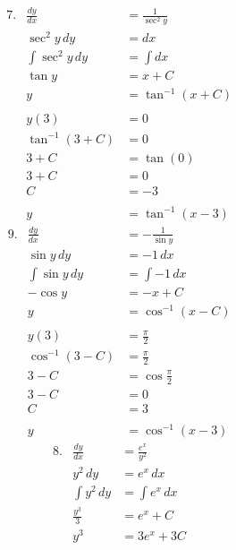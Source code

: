 \documentclass[12pt]{article}
\begin{document}
\begin{multicols*}{2}
    \vspace*{-100pt}
    \begin{align*}
        &7.& \frac{dy}{dx} &= \frac{1}{\sec^2\! y} \\
        &&\sec^2\! y\,dy &= dx \\
        &&\int \sec^2\!y\,dy &= \int dx \\
        &&\tan y &= x + C \\
        &&y &= \tan^{-1}(x + C) \\ \\
        &&y(3) &= 0 \\ 
        &&\tan^{-1}(3 + C) &= 0 \\
        &&3+C &= \tan(0) \\
        &&3 + C &= 0 \\
        &&C &= -3 \\ \\
        &&y &= \tan^{-1}(x - 3)
    \end{align*}
    \vspace{30pt}
    \begin{align*}
        &9.&\frac{dy}{dx} &= -\frac{1}{\sin y} \\
        &&\sin \! y\,dy &= -1\,dx \\
        &&\int \sin \! y\,dy &= \int -1\,dx \\
        &&-\cos y &= -x + C \\
        &&y &= \cos^{-1}(x - C) \\ \\
        &&y(3) &= \frac{\pi}{2} \\
        &&\cos^{-1}(3 - C) &= \frac{\pi}{2} \\
        &&3 - C &= \cos \frac{\pi}{2} \\
        &&3 - C &= 0 \\
        &&C &= 3 \\ \\
        &&y &= \cos^{-1}(x - 3)
    \end{align*}
    \columnbreak
    \begin{align*}
        &8.&\frac{dy}{dx} &= \frac{e^x}{y^2} \\
        &&y^2\,dy &= e^x\,dx \\
        &&\int y^2\,dy &= \int e^x\,dx \\
        &&\frac{y^3}{3} &= e^x + C \\
        &&y^3 &= 3e^x + 3C \\

\end{align*}
\end{multicols*}
\end{document}

